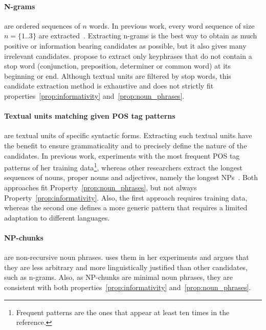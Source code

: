   \paragraph{N-grams} are ordered sequences of $n$ words. In previous work,
  every word sequence of size $n = \{1..3\}$ are
  extracted~\cite{witten1999kea,turney1999learningalgorithms,hulth2003keywordextraction}.
  Extracting n-grams is the best way to obtain as much positive or information
  bearing candidates as possible, but it also gives many irrelevant candidates.
   propose to extract only keyphrases that do not
  contain a stop word (conjunction, preposition, determiner or common word) at
  its beginning or end. Although textual units are filtered by stop words, this
  candidate extraction method is exhaustive and does not strictly fit
  properties~\ref{prop:informativity} and~\ref{prop:noun_phrases}.

  \paragraph{Textual units matching given POS tag patterns} are textual units of
  specific syntactic forms. Extracting such textual units have the benefit to
  ensure grammaticality and to precisely define the nature of the
  candidates. In previous work,  experiments
  with the most frequent POS tag patterns of her training data\footnote{Frequent
  patterns are the ones that appear at least ten times in the reference.},
  whereas other researchers extract the longest sequences of nouns, proper nouns
  and adjectives, namely the longest NPs~\cite{hassan2010conundrums}. Both
  approaches fit Property~\ref{prop:noun_phrases}, but not always
  Property~\ref{prop:informativity}. Also, the first approach requires training
  data, whereas the second one defines a more generic pattern that requires a
  limited adaptation to different languages.

  \paragraph{NP-chunks} are non-recursive noun phrases.
   uses them in her experiments and argues
  that they are less arbitrary and more linguistically justified than other
  candidates, such as n-grams. Also, as NP-chunks are minimal noun phrases,
  they are consistent with both properties~\ref{prop:informativity}
  and~\ref{prop:noun_phrases}.

